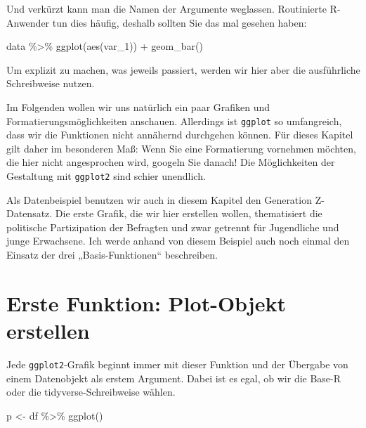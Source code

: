 \documentclass[
]{book}
\newenvironment{Shaded}{\begin{snugshade}}{\end{snugshade}}
\newcommand{\FunctionTok}[1]{\textcolor[rgb]{0.00,0.00,0.00}{#1}}
\newcommand{\NormalTok}[1]{#1}
\newcommand{\OtherTok}[1]{\textcolor[rgb]{0.56,0.35,0.01}{#1}}
\newcommand{\SpecialCharTok}[1]{\textcolor[rgb]{0.00,0.00,0.00}{#1}}
\begin{document}
Und verkürzt kann man die Namen der Argumente weglassen. Routinierte R-Anwender tun dies häufig, deshalb sollten Sie das mal gesehen haben:

\begin{Shaded}
\begin{Highlighting}[]
\NormalTok{data }\SpecialCharTok{\%\textgreater{}\%} 
  \FunctionTok{ggplot}\NormalTok{(}\FunctionTok{aes}\NormalTok{(var\_1)) }\SpecialCharTok{+}
  \FunctionTok{geom\_bar}\NormalTok{()}
\end{Highlighting}
\end{Shaded}

Um explizit zu machen, was jeweils passiert, werden wir hier aber die ausführliche Schreibweise nutzen.

Im Folgenden wollen wir uns natürlich ein paar Grafiken und Formatierungsmöglichkeiten anschauen. Allerdings ist \texttt{ggplot} so umfangreich, dass wir die Funktionen nicht annähernd durchgehen können. Für dieses Kapitel gilt daher im besonderen Maß: Wenn Sie eine Formatierung vornehmen möchten, die hier nicht angesprochen wird, googeln Sie danach! Die Möglichkeiten der Gestaltung mit \texttt{ggplot2} sind schier unendlich.

Als Datenbeispiel benutzen wir auch in diesem Kapitel den Generation Z-Datensatz. Die erste Grafik, die wir hier erstellen wollen, thematisiert die politische Partizipation der Befragten und zwar getrennt für Jugendliche und junge Erwachsene. Ich werde anhand von diesem Beispiel auch noch einmal den Einsatz der drei „Basis-Funktionen`` beschreiben.

\hypertarget{erste-funktion-plot-objekt-erstellen}{%
\section{Erste Funktion: Plot-Objekt erstellen}\label{erste-funktion-plot-objekt-erstellen}}

Jede \texttt{ggplot2}-Grafik beginnt immer mit dieser Funktion und der Übergabe von einem Datenobjekt als erstem Argument. Dabei ist es egal, ob wir die Base-R oder die tidyverse-Schreibweise wählen.

\begin{Shaded}
\begin{Highlighting}[]
\NormalTok{p }\OtherTok{\textless{}{-}}\NormalTok{ df }\SpecialCharTok{\%\textgreater{}\%} 
  \FunctionTok{ggplot}\NormalTok{()}
\end{Highlighting}
\end{Shaded}
\end{document}
